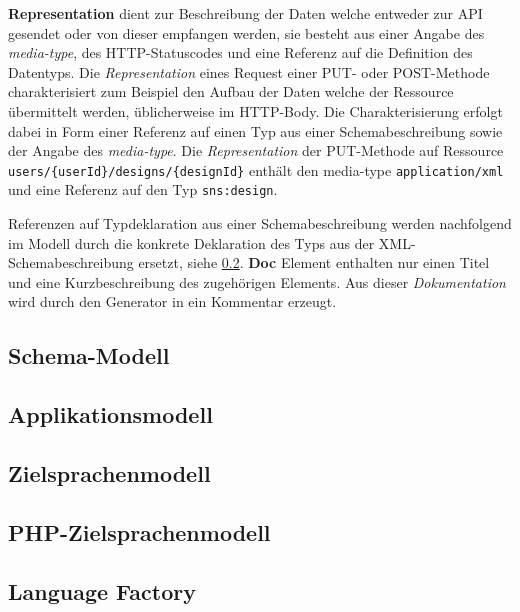 \textbf{Representation} dient zur Beschreibung der Daten welche entweder zur API gesendet oder von dieser empfangen werden, sie besteht aus einer Angabe des \emph{media-type}, des HTTP-Statuscodes und eine Referenz auf die Definition des Datentyps. Die \emph{Representation} eines Request einer PUT- oder POST-Methode charakterisiert zum Beispiel den Aufbau der Daten welche der Ressource übermittelt werden, üblicherweise im HTTP-Body. Die Charakterisierung erfolgt dabei in Form einer Referenz auf einen Typ aus einer Schemabeschreibung sowie der Angabe des \emph{media-type}. Die \emph{Representation} der PUT-Methode auf Ressource \texttt{users/\{userId\}/designs/\{designId\}} enthält den media-type \texttt{application/xml} und eine Referenz auf den Typ \texttt{sns:design}. 

Referenzen auf Typdeklaration aus einer Schemabeschreibung werden nachfolgend im Modell durch die konkrete Deklaration des Typs aus der XML-Schemabeschreibung ersetzt, siehe \cref{sec:application_model}. \textbf{Doc} Element enthalten nur einen Titel und eine Kurzbeschreibung des zugehörigen Elements. Aus dieser \emph{Dokumentation} wird durch den Generator in ein Kommentar erzeugt.

\subsection{Schema-Modell}
\label{sec:schema_model}

\subsection{Applikationsmodell}
\label{sec:application_model}

\subsection{Zielsprachenmodell}
\label{sec:abstract_target_language_model}

\subsection{PHP-Zielsprachenmodell}
\label{sec:php_target_language_model}

\subsection{Language Factory}
\label{sec:language_factory}
